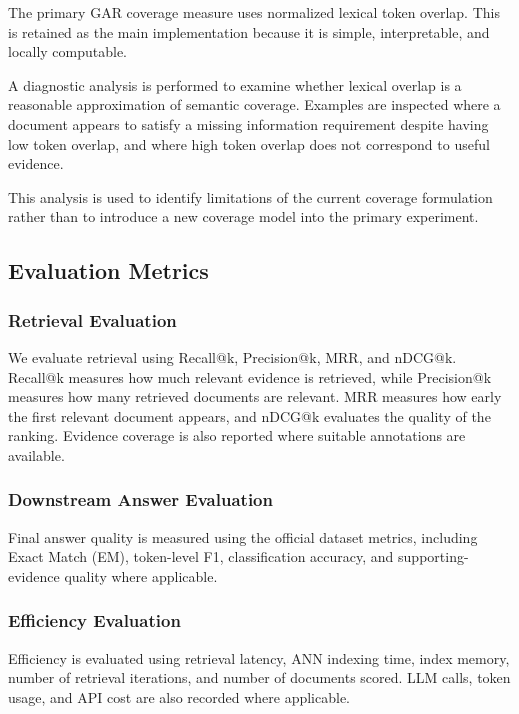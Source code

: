 \documentclass[12pt,a4paper]{report}
\begin{document}
The primary GAR coverage measure uses normalized lexical token overlap. This is retained as the main implementation because it is simple, interpretable, and locally computable.

A diagnostic analysis is performed to examine whether lexical overlap is a reasonable approximation of semantic coverage. Examples are inspected where a document appears to satisfy a missing information requirement despite having low token overlap, and where high token overlap does not correspond to useful evidence.

This analysis is used to identify limitations of the current coverage formulation rather than to introduce a new coverage model into the primary experiment.

\subsection{Evaluation Metrics}

\subsubsection{Retrieval Evaluation}

We evaluate retrieval using Recall@k, Precision@k, MRR, and nDCG@k. Recall@k measures how much relevant evidence is retrieved, while Precision@k measures how many retrieved documents are relevant. MRR measures how early the first relevant document appears, and nDCG@k evaluates the quality of the ranking. Evidence coverage is also reported where suitable annotations are available.

\subsubsection{Downstream Answer Evaluation}

Final answer quality is measured using the official dataset metrics, including Exact Match (EM), token-level F1, classification accuracy, and supporting-evidence quality where applicable.

\subsubsection{Efficiency Evaluation}

Efficiency is evaluated using retrieval latency, ANN indexing time, index memory, number of retrieval iterations, and number of documents scored. LLM calls, token usage, and API cost are also recorded where applicable.
\end{document}
